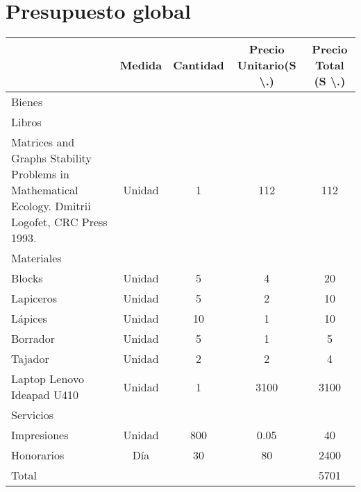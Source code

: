 \documentclass[a4paper,12pt]{article}
\begin{document}
\section{Presupuesto global}
\begin{center}
\begin{tabular}{|p{3.5cm}|c|c|c|c|}
\hline
& Medida & Cantidad & Precio Unitario(S \textbackslash .) & Precio Total (S \textbackslash .) \\
\hline
\multicolumn{5}{|l|}{\cellcolor[gray]{0.9} Bienes}\\
\hline
\multicolumn{5}{|l|}{Libros}\\
\hline
Matrices and Graphs Stability Problems in Mathematical Ecology. Dmitrii Logofet, CRC Press 1993. & Unidad & 1 & 112 & 112 \\
\hline
\multicolumn{5}{|l|}{Materiales}\\
\hline
Blocks & Unidad & 5 & 4 & 20 \\
\hline
Lapiceros & Unidad & 5 & 2 & 10 \\
\hline
L\'apices & Unidad & 10 & 1 & 10\\ 
\hline
Borrador & Unidad & 5 & 1 & 5 \\
\hline
Tajador & Unidad & 2 & 2 & 4\\
\hline
Laptop Lenovo Ideapad U410 & Unidad & 1  & 3100 & 3100 \\ 
\hline
\multicolumn{5}{|l|}{\cellcolor[gray]{0.9} Servicios}\\
\hline
Impresiones & Unidad & 800 & 0.05 & 40 \\ 
\hline
Honorarios & D\'ia & 30 & 80 & 2400 \\
\hline
\multicolumn{4}{|l|}{Total} & 5701 \\ 
\hline
\end{tabular}	

\end{center}
\end{document}
